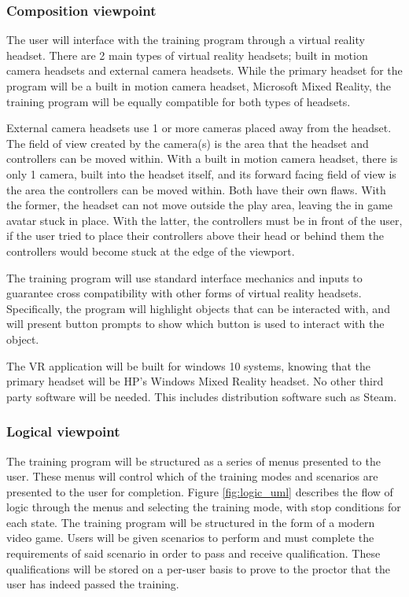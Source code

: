 \documentclass[onecolumn, draftclsnofoot,10pt, compsoc]{IEEEtran}
\begin{document}
\subsubsection{Composition viewpoint}
The user will interface with the training program through a virtual reality headset. There are 2 main types of virtual reality headsets; built in motion camera headsets and external camera headsets. While the primary headset for the program will be a built in motion camera headset, Microsoft Mixed Reality, the training program will be equally compatible for both types of headsets.

External camera headsets use 1 or more cameras placed away from the headset. The field of view created by the camera(s) is the area that the headset and controllers can be moved within. With a built in motion camera headset, there is only 1 camera, built into the headset itself, and its forward facing field of view is the area the controllers can be moved within. Both have their own flaws. With the former, the headset can not move outside the play area, leaving the in game avatar stuck in place. With the latter, the controllers must be in front of the user, if the user tried to place their controllers above their head or behind them the controllers would become stuck at the edge of the viewport. 

The training program will use standard interface mechanics and inputs to guarantee cross compatibility with other forms of virtual reality headsets. Specifically, the program will highlight objects that can be interacted with, and will present button prompts to show which button is used to interact with the object.  

The VR application will be built for windows 10 systems, knowing that the primary headset will be HP's Windows Mixed Reality headset. No other third party software will be needed. This includes distribution software such as Steam.
\subsubsection{Logical viewpoint}

The training program will be structured as a series of menus presented to the user. These menus will control which of the training modes and scenarios are presented to the user for completion. Figure \ref{fig:logic_uml} describes the flow of logic through the menus and selecting the training mode, with stop conditions for each state. The training program will be structured in the form of a modern video game. Users will be given scenarios to perform and must complete the requirements of said scenario in order to pass and receive qualification. These qualifications will be stored on a per-user basis to prove to the proctor that the user has indeed passed the training.
\end{document}
